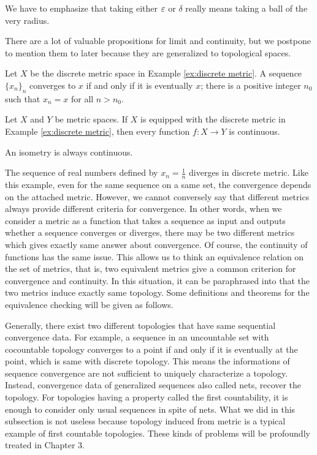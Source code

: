 \documentclass{../crs}
\begin{document}
We have to emphasize that taking either $\varepsilon$ or $\delta$ really means taking a ball of the very radius.






There are a lot of valuable propositions for limit and continuity, but we postpone to mention them to later because they are generalized to topological spaces.

\begin{ex}
Let $X$ be the discrete metric space in Example \ref{ex:discrete metric}.
A sequence $\{x_n\}_n$ converges to $x$ if and only if it is eventually $x$; there is a positive integer $n_0$ such that $x_n=x$ for all $n>n_0$.
\end{ex}
\begin{ex}
Let $X$ and $Y$ be metric spaces.
If $X$ is equipped with the discrete metric in Example \ref{ex:discrete metric}, then every function $f:X\to Y$ is continuous.
\end{ex}
\begin{ex}
An isometry is always continuous.
\end{ex}

The sequence of real numbers defined by $x_n=\frac1n$ diverges in discrete metric.
Like this example, even for the same sequence on a same set, the convergence depends on the attached metric.
However, we cannot conversely say that different metrics always provide different criteria for convergence.
In other words, when we consider a metric as a function that takes a sequence as input and outputs whether a sequence converges or diverges, there may be two different metrics which gives exactly same answer about convergence.
Of course, the continuity of functions has the same issue.
This allows us to think an equivalence relation on the set of metrics, that is, two equivalent metrics give a common criterion for convergence and continuity.
In this situation, it can be paraphrased into that the two metrics induce exactly same topology.
Some definitions and theorems for the equivalence checking will be given as follows.


\begin{rmk}
Generally, there exist two different topologies that have same sequential convergence data.
For example, a sequence in an uncountable set with cocountable topology converges to a point if and only if it is eventually at the point, which is same with discrete topology.
This means the informations of sequence convergence are not sufficient to uniquely characterize a topology.
Instead, convergence data of generalized sequences also called nets, recover the topology.
For topologies having a property called the first countability, it is enough to consider only usual sequences in spite of nets.
What we did in this subsection is not useless because topology induced from metric is a typical example of first countable topologies.
These kinds of problems will be profoundly treated in Chapter 3.
\end{rmk}
\end{document}
